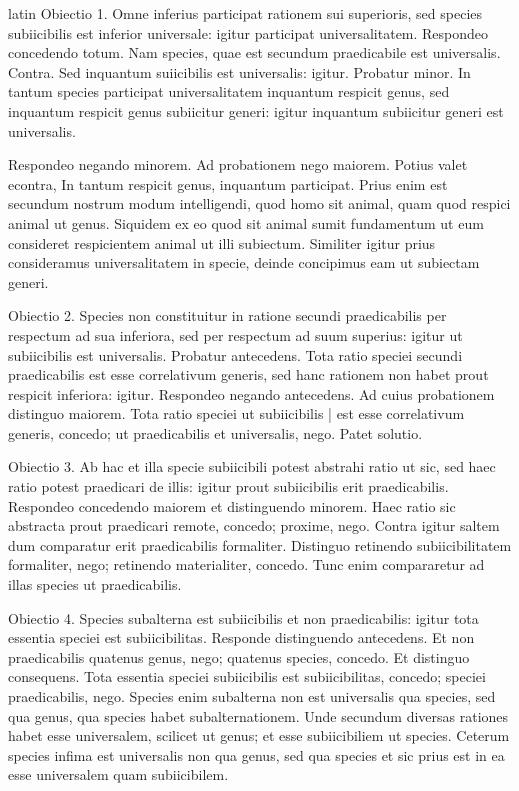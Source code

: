 \begin{otherlanguage*}{latin}
\pstart
Obiectio 1. Omne inferius participat rationem sui superioris, sed species subiicibilis est inferior universale:
igitur participat universalitatem. Respondeo concedendo totum. Nam species, quae est secundum praedicabile est universalis. Contra. Sed inquantum suiicibilis est universalis:
igitur. Probatur minor. In tantum species participat universalitatem inquantum respicit genus, sed inquantum respicit genus subiicitur generi:
igitur inquantum subiicitur generi est universalis. 
\pend

\pstart
Respondeo negando minorem. Ad probationem nego maiorem. Potius valet econtra, In tantum respicit genus, inquantum participat. Prius enim est secundum nostrum modum intelligendi, quod homo sit animal, quam quod respici animal ut genus. Siquidem ex eo quod sit animal sumit fundamentum ut eum consideret respicientem animal ut illi subiectum. Similiter igitur prius consideramus universalitatem in specie, deinde concipimus eam ut subiectam generi. 
\pend

\pstart
Obiectio 2. Species non constituitur in ratione secundi praedicabilis per respectum ad sua inferiora, sed per respectum ad suum superius:
igitur ut subiicibilis est universalis. Probatur antecedens. Tota ratio speciei secundi praedicabilis est esse correlativum generis, sed hanc rationem non habet prout respicit inferiora:
igitur. Respondeo negando antecedens. Ad cuius probationem distinguo maiorem. Tota ratio speciei ut subiicibilis \textnormal{|} est esse correlativum generis, concedo; ut praedicabilis et universalis, nego. Patet solutio. 
\pend

\pstart
Obiectio 3. Ab hac et illa specie subiicibili potest abstrahi ratio ut sic, sed haec ratio potest praedicari de illis:
igitur prout subiicibilis erit praedicabilis. Respondeo concedendo maiorem et distinguendo minorem. Haec ratio sic abstracta prout praedicari remote, concedo; proxime, nego. Contra igitur saltem dum comparatur erit praedicabilis formaliter. Distinguo retinendo subiicibilitatem formaliter, nego; retinendo materialiter, concedo. Tunc enim compararetur ad illas species ut praedicabilis. 
\pend

\pstart
Obiectio 4. Species subalterna est subiicibilis et non praedicabilis:
igitur tota essentia speciei est subiicibilitas. Responde distinguendo antecedens. Et non praedicabilis quatenus genus, nego; quatenus species, concedo. Et distinguo consequens. Tota essentia speciei subiicibilis est subiicibilitas, concedo; speciei praedicabilis, nego. Species enim subalterna non est universalis qua species, sed qua genus, qua species habet subalternationem. Unde secundum diversas rationes habet esse universalem, scilicet ut genus; et esse subiicibiliem ut species. Ceterum species infima est universalis non qua genus, sed qua species et sic prius est in ea esse universalem quam subiicibilem. 
\pend


\end{otherlanguage*}

